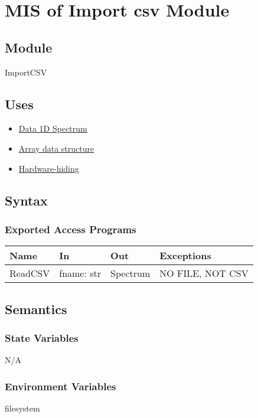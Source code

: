 \documentclass[12pt, titlepage]{article}
\begin{document}
\section{MIS of Import csv Module} \label{Mod:ImportCSV} 
\subsection{Module}
ImportCSV

\subsection{Uses}
\begin{itemize}
\item \hyperref[Mod:Spectrum]{Data 1D Spectrum}
\item \hyperref[Mod:Array]{Array data structure}
\item \hyperref[Mod:HH]{Hardware-hiding}
\end{itemize}

\subsection{Syntax}

\subsubsection{Exported Access Programs}

\begin{center}
\begin{tabular}{p{2cm} p{4cm} p{4cm} p{5cm}}
\hline
\textbf{Name} & \textbf{In} & \textbf{Out} & \textbf{Exceptions} \\
\hline
ReadCSV & fname: str & Spectrum & NO FILE, NOT CSV\\
\hline
\end{tabular}
\end{center}

\subsection{Semantics}

\subsubsection{State Variables}
N/A

\subsubsection{Environment Variables}
filesystem
\end{document}
